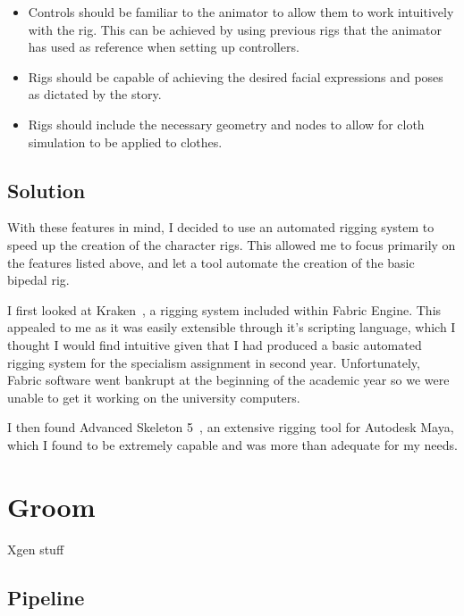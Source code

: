 \documentclass[11pt]{article}
\begin{document}
\begin{itemize}

\item Controls should be familiar to the animator to allow them to work intuitively with the rig. This can be achieved by using previous rigs that the animator has used as reference when setting up controllers.

\item Rigs should be capable of achieving the desired facial expressions and poses as dictated by the story.

\item Rigs should include the necessary geometry and nodes to allow for cloth simulation to be applied to clothes.

\end{itemize}

\subsection{Solution}

With these features in mind, I decided to use an automated rigging system to speed up the creation of the character rigs. This allowed me to focus primarily on the features listed above, and let a tool automate the creation of the basic bipedal rig.

I first looked at Kraken~\cite{kraken}, a rigging system included within Fabric Engine. This appealed to me as it was easily extensible through it's scripting language, which I thought I would find intuitive given that I had produced a basic automated rigging system for the specialism assignment in second year. Unfortunately, Fabric software went bankrupt at the beginning of the academic year so we were unable to get it working on the university computers.

I then found Advanced Skeleton 5~\cite{advancedSkeleton}, an extensive rigging tool for Autodesk Maya, which I found to be extremely capable and was more than adequate for my needs.

\section{Groom}

Xgen stuff


\subsection{Pipeline}
\end{document}
